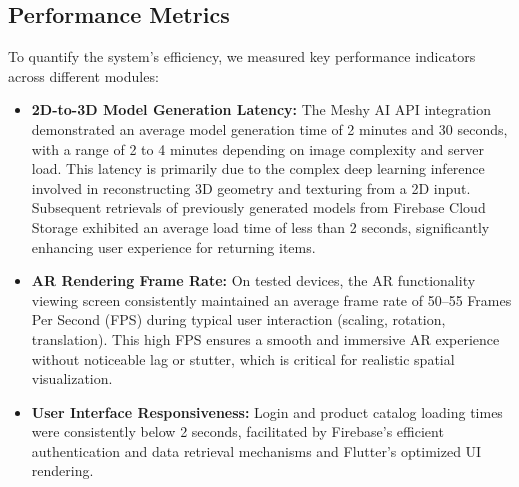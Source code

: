 \documentclass[12pt, a4paper]{article}
\begin{document}
\subsection{Performance Metrics}
To quantify the system's efficiency, we measured key performance indicators across different modules:
\begin{itemize}
    \item \textbf{2D-to-3D Model Generation Latency:} The Meshy AI API integration demonstrated an average model generation time of 2 minutes and 30 seconds, with a range of 2 to 4 minutes depending on image complexity and server load. This latency is primarily due to the complex deep learning inference involved in reconstructing 3D geometry and texturing from a 2D input. Subsequent retrievals of previously generated models from Firebase Cloud Storage exhibited an average load time of less than 2 seconds, significantly enhancing user experience for returning items.
    \item \textbf{AR Rendering Frame Rate:} On tested devices, the AR functionality viewing screen consistently maintained an average frame rate of 50--55 Frames Per Second (FPS) during typical user interaction (scaling, rotation, translation). This high FPS ensures a smooth and immersive AR experience without noticeable lag or stutter, which is critical for realistic spatial visualization.
    \item \textbf{User Interface Responsiveness:} Login and product catalog loading times were consistently below 2 seconds, facilitated by Firebase's efficient authentication and data retrieval mechanisms and Flutter's optimized UI rendering.
\end{itemize}
\end{document}
